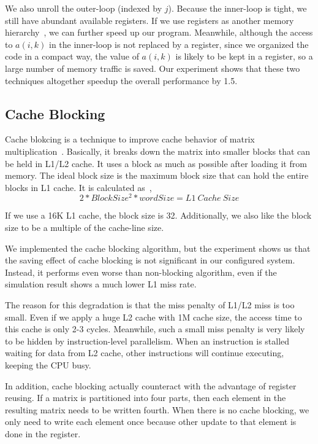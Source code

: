 \documentclass[twocolumn,letterpaper,10pt]{article}
\begin{document}
We also unroll the outer-loop (indexed by $j$). Because
the inner-loop is tight, we still have abundant available
registers. If we use registers as another memory hierarchy~\cite{revisited},
we can further speed up our program. Meanwhile, although the access to
$a(i,k)$ in the inner-loop is not replaced by a register, since we
organized the code in a compact way, the value of $a(i,k)$ is likely
to be kept in a register, so a large number of memory traffic is
saved. Our experiment shows that these two techniques altogether
speedup the overall performance by 1.5.

\subsection{Cache Blocking}
Cache blokcing is a technique to improve cache behavior of matrix
multiplication~\cite{block}. Basically, it breaks down the matrix into smaller
blocks that can be held in L1/L2 cache. It uses a block as much as
possible after loading it from memory. The ideal block size is
the maximum block size that can hold the entire blocks in L1 cache. It
is calculated as~\cite{davis},
\begin{equation}
  2 * BlockSize^2 * wordSize = L1\ Cache\ Size
\end{equation}

If we use a 16K L1 cache, the block size is 32. Additionally, we also like the block
size to be a multiple of the cache-line size.

We implemented the cache blocking algorithm, but the experiment shows
us that the saving effect of cache blocking is not significant in our
configured system. Instead, it performs even worse than non-blocking
algorithm, even if the simulation result shows a much lower L1 miss rate.

The reason for this degradation is that the miss penalty of L1/L2 miss
is too small. Even if we apply a huge L2 cache with 1M cache size, the
access time to this cache is only 2-3 cycles. Meanwhile, such a small miss
penalty is very likely to be hidden by instruction-level
parallelism. When an instruction is stalled waiting for data from L2
cache, other instructions will continue executing, keeping the CPU busy.

In addition, cache blocking actually counteract with the advantage of
register reusing. If a matrix is partitioned into four parts, then
each element in the resulting matrix needs to be written fourth. When 
there is no cache blocking, we only need to write each element
once because other update to that element is done in the register.
\end{document}

